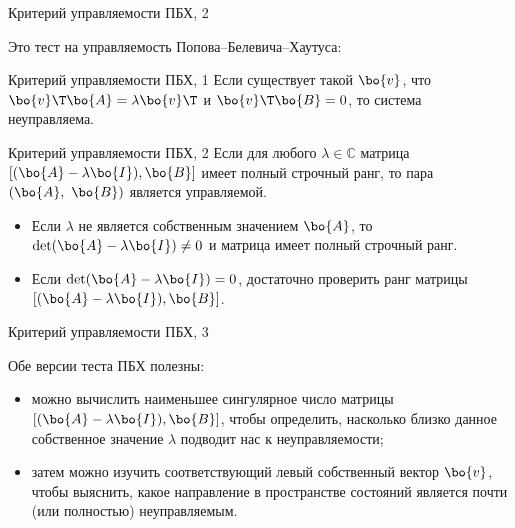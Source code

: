 \documentclass{beamer}
\begin{document}
\begin{frame}{Критерий управляемости ПБХ, 2}
	\begin{flushleft}
		
		Это тест на управляемость Попова–Белевича–Хаутуса:
		
		\begin{block}{Критерий управляемости ПБХ, 1}
			Если существует такой $\bo{v}$, что $\bo{v}\T \bo{A} = \lambda \bo{v}\T$ и $\bo{v}\T\bo{B} = 0$, то система неуправляема.
		\end{block}
		
		\begin{block}{Критерий управляемости ПБХ, 2}
			Если для любого $\lambda \in \mathbb{C}$ матрица $[ (\bo{A}-\lambda\bo{I}), \bo{B}]$ имеет полный строчный ранг, то пара $(\bo{A}, \ \bo{B})$ является управляемой.
		\end{block}
		
		\begin{itemize}
			\item Если $\lambda$ не является собственным значением $\bo{A}$, то $\text{det}(\bo{A}-\lambda\bo{I}) \neq 0$ и матрица имеет полный строчный ранг.
			
			\item Если $\text{det}(\bo{A}-\lambda\bo{I}) = 0$, достаточно проверить ранг матрицы $[ (\bo{A}-\lambda\bo{I}), \bo{B}]$.
			
			
		\end{itemize}
		
	\end{flushleft}
\end{frame}



\begin{frame}{Критерий управляемости ПБХ, 3}
	\begin{flushleft}
		
		Обе версии теста ПБХ полезны: 
		
		\begin{itemize}
			\item можно вычислить наименьшее сингулярное число матрицы $[ (\bo{A}-\lambda\bo{I}), \bo{B}]$, чтобы определить, насколько близко данное собственное значение $\lambda$ подводит нас к неуправляемости; 
			
			\item затем можно изучить соответствующий левый собственный вектор $\bo{v}$, чтобы выяснить, какое направление в пространстве состояний является почти (или полностью) неуправляемым.
		\end{itemize}
		
		
		
	\end{flushleft}
\end{frame}
\end{document}

